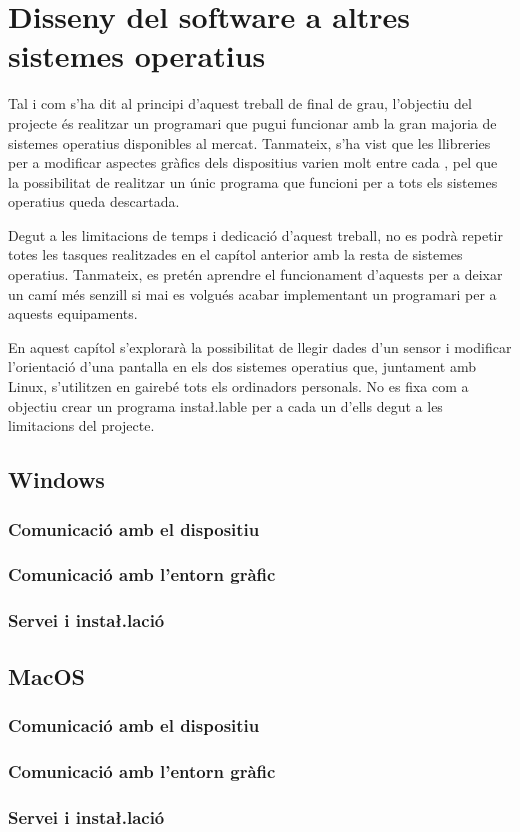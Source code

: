 \chapter{Disseny del software a altres sistemes operatius}
\label{cap:software-other}

Tal i com s'ha dit al principi d'aquest treball de final de grau, l'objectiu
del projecte és realitzar un programari que pugui funcionar amb la gran majoria
de sistemes operatius disponibles al mercat. Tanmateix, s'ha vist que les
llibreries per a modificar aspectes gràfics dels dispositius varien molt entre
cada , pel que la possibilitat de realitzar un únic programa que
funcioni per a tots els sistemes operatius queda descartada.

Degut a les limitacions de temps i dedicació d'aquest treball, no es podrà
repetir totes les tasques realitzades en el capítol anterior amb la resta
de sistemes operatius. Tanmateix, es pretén aprendre el funcionament d'aquests
per a deixar un camí més senzill si mai es volgués acabar implementant un
programari per a aquests equipaments.

En aquest capítol s'explorarà la possibilitat de llegir dades d'un sensor
 i modificar l'orientació d'una pantalla en els dos sistemes operatius
que, juntament amb Linux, s'utilitzen en gairebé tots els ordinadors personals.
No es fixa com a objectiu crear un programa insta\l.lable per a cada un d'ells
degut a les limitacions del projecte.

\section{Windows}
\subsection{Comunicació amb el dispositiu}
\subsection{Comunicació amb l'entorn gràfic}
\subsection{Servei i insta\l.lació}

\section{MacOS}
\subsection{Comunicació amb el dispositiu}
\subsection{Comunicació amb l'entorn gràfic}
\subsection{Servei i insta\l.lació}

